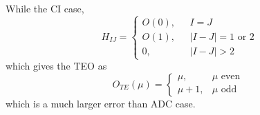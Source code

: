 \documentclass[bachelor, english]{ustcthesis}
\begin{document}
While the CI case, 
\begin{equation}
H_{IJ}=\left\{ 
\begin{array}{ll}
	O(0), & \text{ } I=J
	\\
	O(1), & \text{ } |I-J|=1 \text{ or } 2
	\\
	0,    & \text{ } |I-J|>2
\end{array}
\right.
\end{equation}
which gives the TEO as
\begin{equation}
	O_{T E}(\mu)=\left\{\begin{array}{ll}{\mu,} & {\mu \text { even }} \\ {\mu+1,} & {\mu \text { odd }}\end{array}\right.
\end{equation}
which is a much larger error than ADC case.





\appendix


\backmatter


\end{document}

